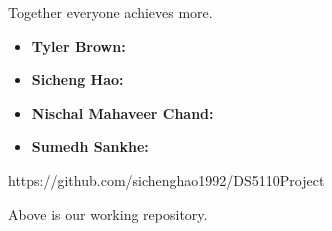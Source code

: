 \documentclass[12pt]{article}
\begin{document}
Together everyone achieves more.

\begin{itemize}
\item \textbf{Tyler Brown:}
\item \textbf{Sicheng Hao:}
\item \textbf{Nischal Mahaveer Chand:}
\item \textbf{Sumedh Sankhe:}
\end{itemize}

 


\begin{appendices}

https://github.com/sichenghao1992/DS5110Project

Above is our working repository.

\end{appendices}
\end{document}
